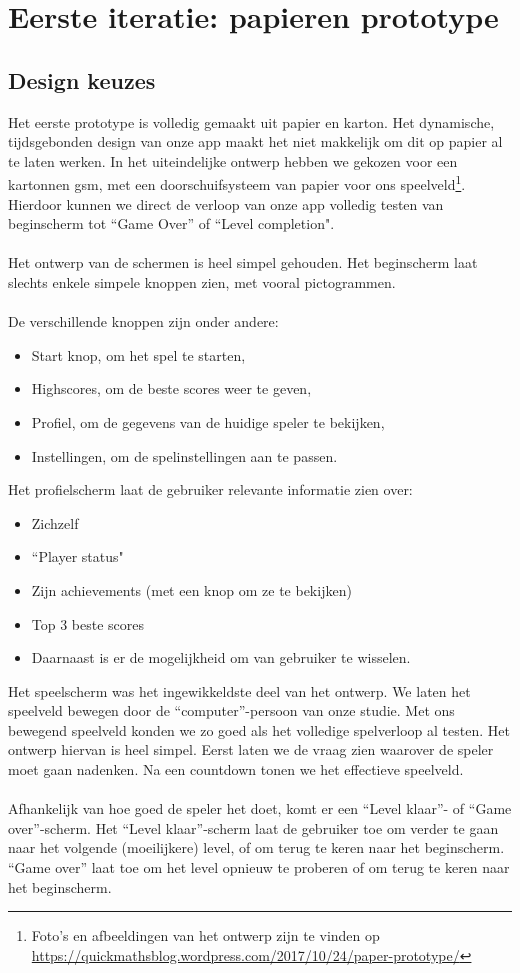\documentclass[11pt]{article}
\begin{document}
\section{Eerste iteratie: papieren prototype}\label{eerste:iteratie}
	\subsection{Design keuzes}
Het eerste prototype is volledig gemaakt uit papier en karton. Het dynamische, tijdsgebonden design van onze app maakt het niet makkelijk om dit op papier al te laten werken. In het uiteindelijke ontwerp hebben we gekozen voor een kartonnen gsm, met een doorschuifsysteem van papier voor ons speelveld\footnote{Foto's en afbeeldingen van het ontwerp zijn te vinden op \url{https://quickmathsblog.wordpress.com/2017/10/24/paper-prototype/}}. Hierdoor kunnen we direct de verloop van onze app volledig testen van beginscherm tot ``Game Over'' of ``Level completion".\\\\
Het ontwerp van de schermen is heel simpel gehouden. Het beginscherm laat slechts enkele simpele knoppen zien, met vooral pictogrammen.\\\\
De verschillende knoppen zijn onder andere:
\begin{itemize}
	\item Start knop, om het spel te starten,
	\item Highscores, om de beste scores weer te geven,
	\item Profiel, om de gegevens van de huidige speler te bekijken,
	\item Instellingen, om de spelinstellingen aan te passen.
\end{itemize}
Het profielscherm laat de gebruiker relevante informatie zien over:
\begin{itemize}
	\item Zichzelf
	\item ``Player status"
	\item Zijn achievements (met een knop om ze te bekijken)
	\item Top 3 beste scores
	\item Daarnaast is er de mogelijkheid om van gebruiker te wisselen.
\end{itemize}
Het speelscherm was het ingewikkeldste deel van het ontwerp. We laten het speelveld bewegen door de ``computer''-persoon van onze studie. Met ons bewegend speelveld konden we zo goed als het volledige spelverloop al testen. Het ontwerp hiervan is heel simpel. Eerst laten we de vraag zien waarover de speler moet gaan nadenken. Na een countdown tonen we het effectieve speelveld.\\\\
Afhankelijk van hoe goed de speler het doet, komt er een ``Level klaar''- of ``Game over''-scherm. Het “Level klaar”-scherm laat de gebruiker toe om verder te gaan naar het volgende (moeilijkere) level, of om terug te keren naar het beginscherm. ``Game over'' laat toe om het level opnieuw te proberen of om terug te keren naar het beginscherm.
    
\end{document}
